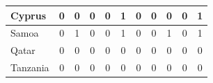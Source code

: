 \documentclass[12pt]{article}  %
\begin{document}
\begin{subappendices}
\begin{longtable}{|l|c|c|c|c|c|c|c|c|c|c|}
	\hline
	Cyprus                                                         & 0                                                                      & 0                                                                      & 0                                                                      & 0                                                                      & 1                                                                      & 0                                                                      & 0                         & 0                           & 0                           & 1                           \\ 
	\hline
	Samoa                                                          & 0                                                                      & 1                                                                      & 0                                                                      & 0                                                                      & 1                                                                      & 0                                                                      & 0                         & 1                           & 0                           & 1                           \\ 
	\hline
	Qatar                                                          & 0                                                                      & 0                                                                      & 0                                                                      & 0                                                                      & 0                                                                      & 0                                                                      & 0                         & 0                           & 0                           & 0                           \\ 
	\hline
	Tanzania                                                       & 0                                                                      & 0                                                                      & 0                                                                      & 0                                                                      & 0                                                                      & 0                                                                      & 0                         & 0                           & 0                           & 0                           \\ 

\end{longtable}
\end{subappendices}
\end{document}
